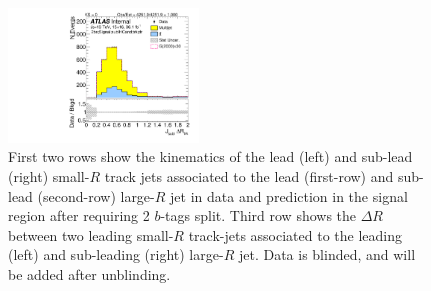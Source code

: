 \begin{figure}[htbp!]
\begin{center}
\includegraphics[width=0.45\textwidth,angle=-90]{figures/boosted/Signal/b77_TwoTag_split_Signal_sublHCand_trk_dr_blind.pdf}
  \caption{First two rows show the kinematics of the lead (left) and sub-lead (right) small-$R$ track jets associated to the lead (first-row) and sub-lead (second-row) large-$R$ jet in data and prediction in the signal region after requiring 2 $b$-tags split. Third row shows the $\Delta R$ between two leading small-$R$ track-jets associated to the leading (left) and sub-leading (right) large-$R$ jet. Data is blinded, and will be added after unblinding. }
  \label{fig:boosted-2bs-signal-blind-ak2}
\end{center}
\end{figure}


